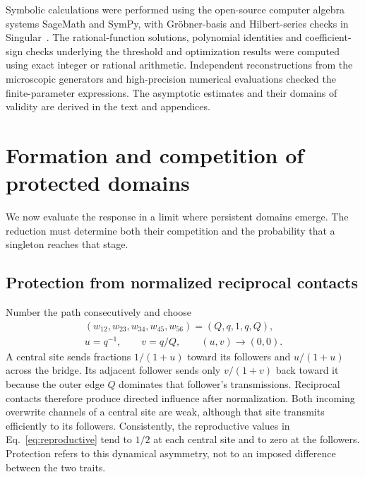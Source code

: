 \documentclass[aps,pre,reprint,amsmath,amssymb,longbibliography]{revtex4-2}
\begin{document}
Symbolic calculations were performed using the open-source computer
algebra systems SageMath and SymPy, with Gr\"obner-basis and Hilbert-series
checks in Singular~\cite{SageMathSoftware,SymPySoftware,SingularSoftware}.
The rational-function solutions, polynomial identities and coefficient-sign
checks underlying the threshold and optimization results were computed
using exact integer or rational arithmetic. Independent reconstructions
from the microscopic generators and high-precision numerical evaluations
checked the finite-parameter expressions. The asymptotic estimates and
their domains of validity are derived in the text and appendices.


\section{Formation and competition of protected domains}
\label{sec:domains}
We now evaluate the response in a limit where persistent domains emerge.
The reduction must determine both their competition and the probability
that a singleton reaches that stage.

\subsection{Protection from normalized reciprocal contacts}
\label{sec:protected-mechanism}
Number the path consecutively and choose
\begin{equation}
 \begin{gathered}
 (w_{12},w_{23},w_{34},w_{45},w_{56})=(Q,q,1,q,Q),\\
 u=q^{-1},\qquad v=q/Q,\qquad (u,v)\longrightarrow(0,0).
 \end{gathered}
 \label{eq:p6-weights}
\end{equation}
A central site sends fractions $1/(1+u)$ toward its followers and
$u/(1+u)$ across the bridge. Its adjacent follower sends only
$v/(1+v)$ back toward it because the outer edge $Q$ dominates that
follower's transmissions. Reciprocal contacts therefore produce
directed influence after normalization.
Both incoming overwrite channels of a central site are weak, although
that site transmits efficiently to its followers. Consistently, the reproductive
values in Eq.~\eqref{eq:reproductive} tend to $1/2$ at each central site and
to zero at the followers. Protection refers to this dynamical
asymmetry, not to an imposed difference between the two traits.
\end{document}

